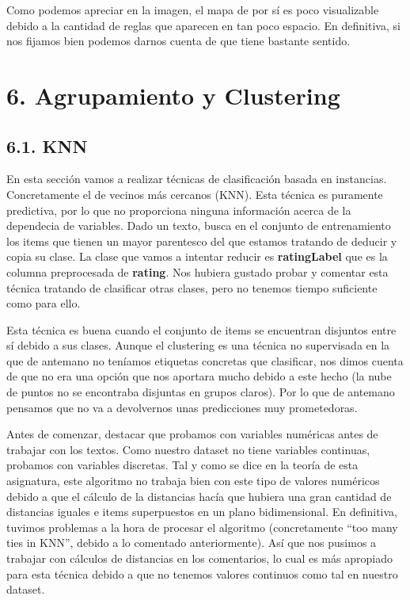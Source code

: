 \documentclass[spanish,]{article}
\begin{document}
Como podemos apreciar en la imagen, el mapa de por sí es poco
visualizable debido a la cantidad de reglas que aparecen en tan poco
espacio. En definitiva, si nos fijamos bien podemos darnos cuenta de que
tiene bastante sentido.

\newpage

\section{6. Agrupamiento y Clustering}\label{agrupamiento-y-clustering}

\subsection{6.1. KNN}\label{knn}

En esta sección vamos a realizar técnicas de clasificación basada en
instancias. Concretamente el de vecinos más cercanos (KNN). Esta técnica
es puramente predictiva, por lo que no proporciona ninguna información
acerca de la dependecia de variables. Dado un texto, busca en el
conjunto de entrenamiento los items que tienen un mayor parentesco del
que estamos tratando de deducir y copia su clase. La clase que vamos a
intentar reducir es \textbf{ratingLabel} que es la columna preprocesada
de \textbf{rating}. Nos hubiera gustado probar y comentar esta técnica
tratando de clasificar otras clases, pero no tenemos tiempo suficiente
como para ello.

Esta técnica es buena cuando el conjunto de items se encuentran
disjuntos entre sí debido a sus clases. Aunque el clustering es una
técnica no supervisada en la que de antemano no teníamos etiquetas
concretas que clasificar, nos dimos cuenta de que no era una opción que
nos aportara mucho debido a este hecho (la nube de puntos no se
encontraba disjuntas en grupos claros). Por lo que de antemano pensamos
que no va a devolvernos unas predicciones muy prometedoras.

Antes de comenzar, destacar que probamos con variables numéricas antes
de trabajar con los textos. Como nuestro dataset no tiene variables
continuas, probamos con variables discretas. Tal y como se dice en la
teoría de esta asignatura, este algoritmo no trabaja bien con este tipo
de valores numéricos debido a que el cálculo de la distancias hacía que
hubiera una gran cantidad de distancias iguales e items superpuestos en
un plano bidimensional. En definitiva, tuvimos problemas a la hora de
procesar el algoritmo (concretamente ``too many ties in KNN'', debido a
lo comentado anteriormente). Así que nos pusimos a trabajar con cálculos
de distancias en los comentarios, lo cual es más apropiado para esta
técnica debido a que no tenemos valores continuos como tal en nuestro
dataset.
\end{document}
